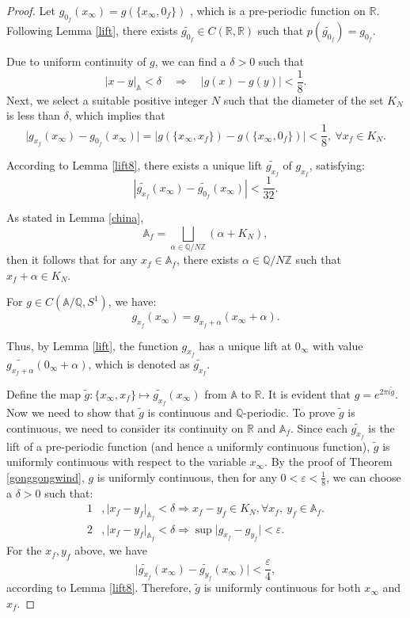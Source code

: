 \documentclass[11pt]{article}
\newcommand{\A}{\mathbb{A}}
\theoremstyle{remark}
\begin{document}
\begin{proof}
    Let \( g_{0_f}(x_\infty) = g(\{x_{\infty}, 0_f\}) \) , which is a pre-periodic function on \( \mathbb{R} \). Following Lemma \ref{lift}, there exists \( \widetilde{g_{0_f}} \in C(\mathbb{R}, \mathbb{R}) \) such that \( p(\widetilde{g_{0_f}}) = g_{0_f} \).

Due to uniform continuity of $g$, we can find a $\delta > 0$ such that 
\[
|x - y|_{\A} < \delta \quad \Rightarrow \quad |g(x) - g(y)| < \frac{1}{8}.
\]
 Next, we select a suitable positive integer \( N \) such that the diameter of the set $K_N$ is less than $\delta$, which implies that
\[
\lvert g_{x_f}(x_\infty) - g_{0_f}(x_\infty)\rvert= \lvert g(\{x_{\infty}, x_f\}) - g(\{x_{\infty}, 0_f\})\rvert < \frac{1}{8},\ \forall x_f\in K_N.
\]

According to Lemma \ref{lift8}, there exists a unique lift \(\widetilde{g_{x_f}}\) of \( g_{x_f} \), satisfying:
\[
|\widetilde{g_{x_f}}(x_\infty) - \widetilde{g_{0_f}}(x_\infty)| < \frac{1}{32}.
\]

As stated in Lemma \ref{china},
\[
\A_f = \bigsqcup_{\alpha\in \mathbb{Q}/N\mathbb{Z}} \left( \alpha + K_N\right),
\]
then it follows that for any \( x_f \in \A_f \), there exists \( \alpha \in \mathbb{Q}/N\mathbb{Z} \) such that \( x_f + \alpha \in K_N \). 

For \( g \in C(\mathbb{A}/\mathbb{Q},S^1) \), we have:
\[
g_{x_f}(x_\infty) = g_{x_f + \alpha}(x_\infty+\alpha).
\]

Thus, by Lemma \ref{lift}, the function \( g_{x_f} \) has a unique lift at \( 0_{\infty} \) with value \( \widetilde{g_{x_f + \alpha}}(0_\infty+\alpha) \), which is denoted as \( \widetilde{g_{x_f}} \).

Define the map \( \widetilde{g}: \{x_{\infty}, x_f\} \mapsto \widetilde{g_{x_f}}(x_\infty) \) from \( \A \) to \( \mathbb{R} \). It is evident that $g=e^{2\pi i \tilde{g}}.$ Now we need to show that $\tilde{g}$ is continuous and $\mathbb{Q}$-periodic. To prove $\tilde{g}$ is continuous, we need to consider its continuity on $\mathbb{R}$ and $\A_f$. Since each $\widetilde{g_{x_f}}$ is the lift of a pre-periodic function (and hence a uniformly continuous function), $\tilde{g}$ is uniformly continuous with respect to the variable $x_\infty$. By the proof of Theorem \ref{gonggongwind}, $g$ is uniformly continuous, then for any $0<\varepsilon<\frac{1}{8}$, we can choose a $\delta >0$ such that:
\begin{align}
    1&, \lvert x_f-y_f\rvert_{\A_f}<\delta \Rightarrow x_f-y_f\in K_N, \forall x_f,\ y_f\in \mathbb{A}_f.\\
    2&,\lvert x_f-y_f\rvert_{\A_f}<\delta \Rightarrow \sup\lvert g_{x_f}-g_{y_f}\rvert<\varepsilon.
\end{align}
For the $x_f,y_f$ above, we have
\[
\lvert \widetilde{g_{x_f}}(x_\infty)-\widetilde{g_{y_f}}(x_\infty)\rvert<\frac{\varepsilon}{4},
\]
according to Lemma \ref{lift8}. Therefore, $\tilde{g}$ is uniformly continuous for both $x_\infty$ and $x_f$.


\end{proof}
\end{document}
